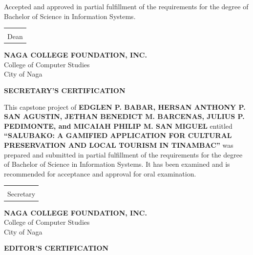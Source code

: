 \documentclass{research}
\newcommand{\ncfletterhead}{%
  \begin{center}
    {\bfseries NAGA COLLEGE FOUNDATION, INC.}\\[0.3em]
    College of Computer Studies\\[0.3em]
    City of Naga
  \end{center}
  \vspace{1em}
}
\begin{document}
\vspace{2em}

\noindent Accepted and approved in partial fulfillment of the requirements for the
degree of Bachelor of Science in Information Systems.

\vspace{2em}

\noindent
\begin{tabular}{p{7cm}}
  \underline{\hspace{7cm}} \\
  Dean \\
\end{tabular}

\clearpage

\ncfletterhead

\begin{center}
  {\bfseries SECRETARY'S CERTIFICATION}
\end{center}

\vspace{0.5em}

\noindent
This capstone project of \textbf{EDGLEN P. BABAR, HERSAN ANTHONY P. SAN AGUSTIN,
JETHAN BENEDICT M. BARCENAS, JULIUS P. PEDIMONTE, and MICAIAH PHILIP M. SAN MIGUEL}
entitled \textbf{``SALUBAKO: A GAMIFIED APPLICATION FOR CULTURAL PRESERVATION AND LOCAL
TOURISM IN TINAMBAC''} was prepared and submitted in partial fulfillment of the
requirements for the degree of Bachelor of Science in Information Systems.
It has been examined and is recommended for acceptance and approval for oral
examination.

\vspace{4em}

\noindent
\begin{tabular}{p{7cm}}
  \underline{\hspace{7cm}} \\
  Secretary \\
\end{tabular}

\clearpage

\ncfletterhead

\begin{center}
  {\bfseries EDITOR'S CERTIFICATION}
\end{center}
\end{document}
